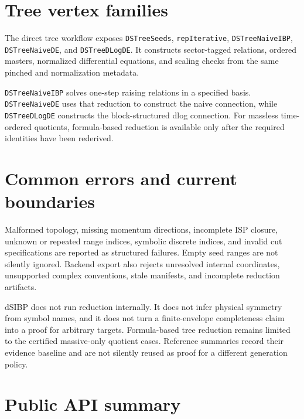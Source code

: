 ﻿\documentclass[a4paper,11pt]{article}
\begin{document}
\section{Tree vertex families}

The direct tree workflow exposes \texttt{DSTreeSeeds}, \texttt{repIterative},
\texttt{DSTreeNaiveIBP}, \texttt{DSTreeNaiveDE}, and \texttt{DSTreeDLogDE}. It constructs
sector-tagged relations, ordered masters, normalized differential equations, and scaling
checks from the same pinched and normalization metadata.

\texttt{DSTreeNaiveIBP} solves one-step raising relations in a specified basis.
\texttt{DSTreeNaiveDE} uses that reduction to construct the naive connection, while
\texttt{DSTreeDLogDE} constructs the block-structured dlog connection. For massless time-ordered
quotients, formula-based reduction is available only after the required identities have
been rederived.

\section{Common errors and current boundaries}

Malformed topology, missing momentum directions, incomplete ISP closure, unknown or
repeated range indices, symbolic discrete indices, and invalid cut specifications are
reported as structured failures. Empty seed ranges are not silently ignored. Backend export
also rejects unresolved internal coordinates, unsupported complex conventions, stale
manifests, and incomplete reduction artifacts.

dSIBP does not run reduction internally. It does not infer physical symmetry from symbol
names, and it does not turn a finite-envelope completeness claim into a proof for arbitrary
targets. Formula-based tree reduction remains limited to the certified massive-only
quotient cases. Reference summaries record their evidence baseline and are not silently
reused as proof for a different generation policy.

\section{Public API summary}
\end{document}
